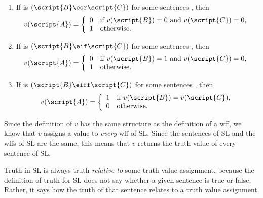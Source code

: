 \begin{enumerate}
\item If  is $(\script{B}\eor\script{C})$ for some sentences , then
\begin{displaymath}v(\script{A}) =
	\left\{\begin{array}{ll}
	0 & \mbox{if $v(\script{B}) = 0$ and $v(\script{C}) = 0$,}\\
	1 & \mbox{otherwise.}
	\end{array}\right.
\end{displaymath}
\item If  is $(\script{B}\eif\script{C})$ for some sentences , then
\begin{displaymath}v(\script{A}) =
	\left\{\begin{array}{ll}
	0 & \mbox{if $v(\script{B}) = 1$ and $v(\script{C}) = 0$,}\\
	1 & \mbox{otherwise.}
	\end{array}\right.
\end{displaymath}



\item If  is $(\script{B}\eiff\script{C})$ for some sentences , then
\begin{displaymath}v(\script{A}) =
	\left\{\begin{array}{ll}
	1 & \mbox{if $v(\script{B}) = v(\script{C})$},\\
	0 & \mbox{otherwise.}
	\end{array}\right.
\end{displaymath}
\end{enumerate}

Since the definition of $v$ has the same structure as the definition of a wff, we know that $v$ assigns a value to \emph{every} wff of SL. Since the sentences of SL and the wffs of SL are the same, this means that $v$ returns the truth value of every sentence of SL.

Truth in SL is always truth \emph{relative to} some truth value assignment, because the definition of truth for SL does not say whether a given sentence is true or false. Rather, it says how the truth of that sentence relates to a truth value assignment.


